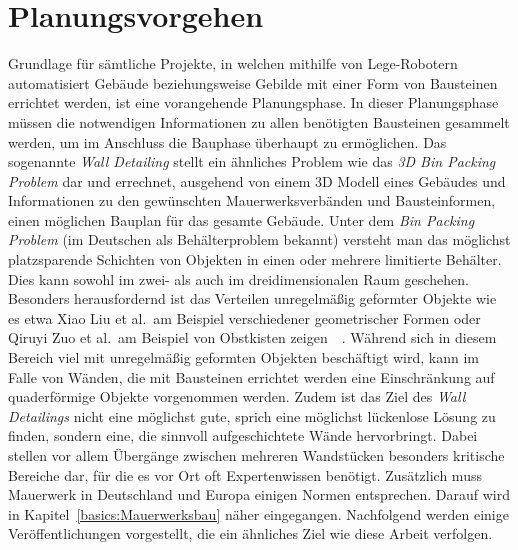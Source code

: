 \section{Planungsvorgehen}
Grundlage für sämtliche Projekte, in welchen mithilfe von Lege-Robotern automatisiert Gebäude beziehungsweise Gebilde mit einer Form von Bausteinen errichtet werden, ist eine vorangehende Planungsphase.
In dieser Planungsphase müssen die notwendigen Informationen zu allen benötigten Bausteinen gesammelt werden, um im Anschluss die Bauphase überhaupt zu ermöglichen.
Das sogenannte \textit{Wall Detailing} stellt ein ähnliches Problem wie das \textit{3D Bin Packing Problem} dar und errechnet, ausgehend von einem 3D Modell eines Gebäudes und Informationen zu den gewünschten Mauerwerksverbänden und Bausteinformen, einen möglichen Bauplan für das gesamte Gebäude.
Unter dem \textit{Bin Packing Problem} (im Deutschen als Behälterproblem bekannt) versteht man das möglichst platzsparende Schichten von Objekten in einen oder mehrere limitierte Behälter.
Dies kann sowohl im zwei- als auch im dreidimensionalen Raum geschehen.
Besonders herausfordernd ist das Verteilen unregelmäßig geformter Objekte wie es etwa Xiao Liu et al.\ am Beispiel verschiedener geometrischer Formen oder Qiruyi Zuo et al.\ am Beispiel von Obstkisten zeigen~\cite{Liu2015}~\cite{Zuo2022}.
Während sich in diesem Bereich viel mit unregelmäßig geformten Objekten beschäftigt wird, kann im Falle von Wänden, die mit Bausteinen errichtet werden eine Einschränkung auf quaderförmige Objekte vorgenommen werden.
Zudem ist das Ziel des \textit{Wall Detailings} nicht eine möglichst gute, sprich eine möglichst lückenlose Lösung zu finden, sondern eine, die sinnvoll aufgeschichtete Wände hervorbringt.
Dabei stellen vor allem Übergänge zwischen mehreren Wandstücken besonders kritische Bereiche dar, für die es vor Ort oft Expertenwissen benötigt.
Zusätzlich muss Mauerwerk in Deutschland und Europa einigen Normen entsprechen. 
Darauf wird in Kapitel~\ref{basics:Mauerwerksbau} näher eingegangen.
Nachfolgend werden einige Veröffentlichungen vorgestellt, die ein ähnliches Ziel wie diese Arbeit verfolgen.

